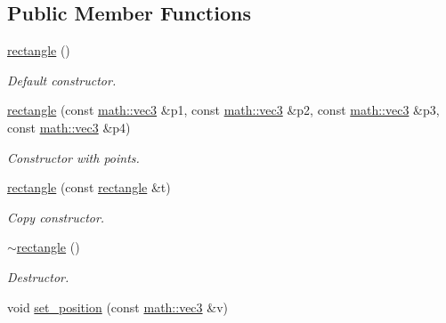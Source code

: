 \subsection*{Public Member Functions}
\begin{DoxyCompactItemize}
\item 
\mbox{\label{classphysim_1_1geom_1_1rectangle_a11f57e3aaf4c4ab99d37515a6d52640e}} 
\hyperlink{classphysim_1_1geom_1_1rectangle_a11f57e3aaf4c4ab99d37515a6d52640e}{rectangle} ()
\begin{DoxyCompactList}\small\item\em Default constructor. \end{DoxyCompactList}\item 
\hyperlink{classphysim_1_1geom_1_1rectangle_aab87c4d353913cacdf4b1ef9587b7e7e}{rectangle} (const \hyperlink{structphysim_1_1math_1_1vec3}{math\+::vec3} \&p1, const \hyperlink{structphysim_1_1math_1_1vec3}{math\+::vec3} \&p2, const \hyperlink{structphysim_1_1math_1_1vec3}{math\+::vec3} \&p3, const \hyperlink{structphysim_1_1math_1_1vec3}{math\+::vec3} \&p4)
\begin{DoxyCompactList}\small\item\em Constructor with points. \end{DoxyCompactList}\item 
\mbox{\label{classphysim_1_1geom_1_1rectangle_a217b75dfe201c31809237fd63c71050a}} 
\hyperlink{classphysim_1_1geom_1_1rectangle_a217b75dfe201c31809237fd63c71050a}{rectangle} (const \hyperlink{classphysim_1_1geom_1_1rectangle}{rectangle} \&t)
\begin{DoxyCompactList}\small\item\em Copy constructor. \end{DoxyCompactList}\item 
\mbox{\label{classphysim_1_1geom_1_1rectangle_a13747d68358d80da954bc4b3ac5ec187}} 
\hyperlink{classphysim_1_1geom_1_1rectangle_a13747d68358d80da954bc4b3ac5ec187}{$\sim$rectangle} ()
\begin{DoxyCompactList}\small\item\em Destructor. \end{DoxyCompactList}\item 
void \hyperlink{classphysim_1_1geom_1_1rectangle_a4e9fda61b51ce89fc073f880a7823a55}{set\+\_\+position} (const \hyperlink{structphysim_1_1math_1_1vec3}{math\+::vec3} \&v)

\end{DoxyCompactItemize}
